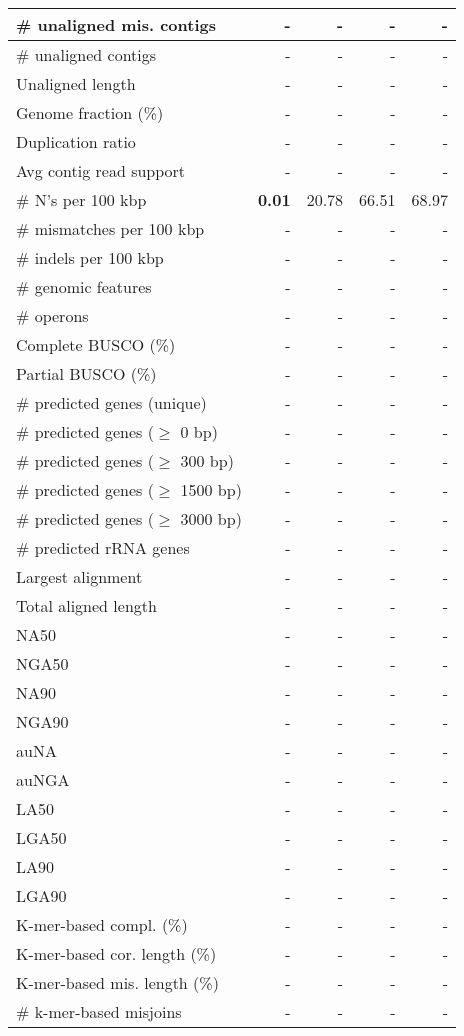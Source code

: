 \documentclass[12pt,a4paper]{article}
\begin{document}
\begin{table}[ht]
\begin{center}
\begin{tabular}{|l*{4}{|r}|}
\# unaligned mis. contigs & - & - & - & - \\ \hline
\# unaligned contigs & - & - & - & - \\ \hline
Unaligned length & - & - & - & - \\ \hline
Genome fraction (\%) & - & - & - & - \\ \hline
Duplication ratio & - & - & - & - \\ \hline
Avg contig read support & - & - & - & - \\ \hline
\# N's per 100 kbp & {\bf 0.01} & 20.78 & 66.51 & 68.97 \\ \hline
\# mismatches per 100 kbp & - & - & - & - \\ \hline
\# indels per 100 kbp & - & - & - & - \\ \hline
\# genomic features & - & - & - & - \\ \hline
\# operons & - & - & - & - \\ \hline
Complete BUSCO (\%) & - & - & - & - \\ \hline
Partial BUSCO (\%) & - & - & - & - \\ \hline
\# predicted genes (unique) & - & - & - & - \\ \hline
\# predicted genes ($\geq$ 0 bp) & - & - & - & - \\ \hline
\# predicted genes ($\geq$ 300 bp) & - & - & - & - \\ \hline
\# predicted genes ($\geq$ 1500 bp) & - & - & - & - \\ \hline
\# predicted genes ($\geq$ 3000 bp) & - & - & - & - \\ \hline
\# predicted rRNA genes & - & - & - & - \\ \hline
Largest alignment & - & - & - & - \\ \hline
Total aligned length & - & - & - & - \\ \hline
NA50 & - & - & - & - \\ \hline
NGA50 & - & - & - & - \\ \hline
NA90 & - & - & - & - \\ \hline
NGA90 & - & - & - & - \\ \hline
auNA & - & - & - & - \\ \hline
auNGA & - & - & - & - \\ \hline
LA50 & - & - & - & - \\ \hline
LGA50 & - & - & - & - \\ \hline
LA90 & - & - & - & - \\ \hline
LGA90 & - & - & - & - \\ \hline
K-mer-based compl. (\%) & - & - & - & - \\ \hline
K-mer-based cor. length (\%) & - & - & - & - \\ \hline
K-mer-based mis. length (\%) & - & - & - & - \\ \hline
\# k-mer-based misjoins & - & - & - & - \\ \hline
\end{tabular}
\end{center}
\end{table}
\end{document}
